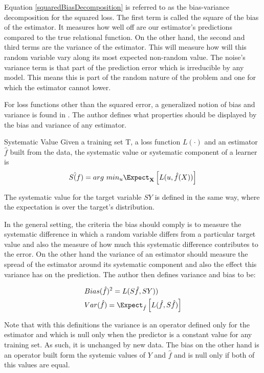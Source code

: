  Equation \ref{squaredBiasDecomposition} is referred to as the bias-variance decomposition for the squared loss. The first term is called the square of the bias of the estimator. It measures how well off are our estimator's predictions compared to the true relational function. On the other hand, the second and third terms are the variance of the estimator. This will measure how will this random variable vary along its most expected non-random value. The noise's variance term is that part of the prediction error which is irreducible by any model. This means this is part of the random nature of the problem and one for which the estimator cannot lower.
 
 For loss functions other than the squared error, a generalized notion of bias and variance is found in \cite{james-biasVarianceGeneral}. The author defines what properties should be displayed by the bias and variance of any estimator. 
 \begin{definition}{Systematic Value}
 	Given a training set $\mathrm{T}$, a loss function $L(\cdot)$ and an estimator $\hat{f}$ built from the data, the systematic value or systematic component of a learner is 
 	$$ S\hat(f)  =  arg \ min_u \Expect_{\textbf{X}} \left[ L(u,\hat{f}(X)) \right]$$
 \end{definition}
 
 The systematic value for the target variable $SY$ is defined in the same way, where the expectation is over the target's distribution. 
 
 In the general setting, the criteria the bias should comply is to measure the systematic difference in which a random variable differs from a particular target value and also the measure of how much this systematic difference contributes to the error. On the other hand the variance of an estimator should measure the spread of the estimator around its systematic component and also the effect this variance has on the prediction. The author then defines variance and bias to be:
 
 \begin{equation}
 \begin{split}
 & Bias(\hat{f})^2 = L(S\hat{f},SY)) \\
 & Var(\hat{f}) = \Expect_{\hat{f}} \left[  L(\hat{f}  , S\hat{f}) \right]
 \end{split}
 \end{equation}
 
 Note that with this definitions the variance is an operator defined only for the estimator and which is null only when the predictor is a constant value for any training set. As such, it is unchanged by new data. The bias on the other hand is an operator built form the systemic values of $Y$ and $\hat{f}$ and is null only if both of this values are equal.
 

